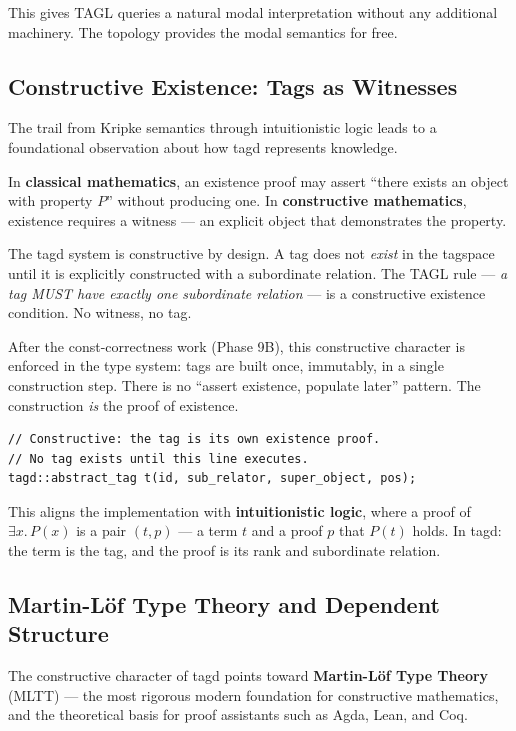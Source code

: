 \documentclass{article}
\begin{document}
This gives TAGL queries a natural modal interpretation without any additional
machinery. The topology provides the modal semantics for free.

\subsection{Constructive Existence: Tags as Witnesses}
\label{sec:constructive}

The trail from Kripke semantics through intuitionistic logic leads to a
foundational observation about how tagd represents knowledge.

In \textbf{classical mathematics}, an existence proof may assert ``there exists
an object with property $P$'' without producing one. In \textbf{constructive
mathematics}, existence requires a witness --- an explicit object that
demonstrates the property.

The tagd system is constructive by design. A tag does not \emph{exist} in the
tagspace until it is explicitly constructed with a subordinate relation. The
TAGL rule --- \emph{a tag MUST have exactly one subordinate relation} --- is a
constructive existence condition. No witness, no tag.

After the const-correctness work (Phase 9B), this constructive character is
enforced in the type system: tags are built once, immutably, in a single
construction step. There is no ``assert existence, populate later'' pattern. The
construction \emph{is} the proof of existence.

\begin{lstlisting}[style=cpp, caption={One-shot construction as constructive existence}]
// Constructive: the tag is its own existence proof.
// No tag exists until this line executes.
tagd::abstract_tag t(id, sub_relator, super_object, pos);
\end{lstlisting}

This aligns the implementation with \textbf{intuitionistic logic}, where a
proof of $\exists x.\, P(x)$ is a pair $(t, p)$ --- a term $t$ and a proof $p$
that $P(t)$ holds. In tagd: the term is the tag, and the proof is its rank and
subordinate relation.

\subsection{Martin-L\"{o}f Type Theory and Dependent Structure}
\label{sec:mltt}

The constructive character of tagd points toward \textbf{Martin-L\"{o}f Type
Theory} (MLTT) --- the most rigorous modern foundation for constructive
mathematics, and the theoretical basis for proof assistants such as Agda, Lean,
and Coq.
\end{document}
